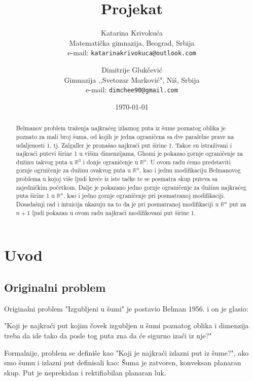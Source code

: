 \documentclass[11pt,letter]{article}
\begin{document}
\title{\bf{Projekat}}

\author{
Katarina Krivoku\'ca \\
Matemati\v cka gimnazija, Beograd, Srbija\\
e-mail: \tt{katarinakrivokuca@outlook.com} \\
\and
Dimitrije Gluk\v cevi\' c \\
Gimnazija ,,Svetozar Markovi\' c", Ni\v s, Srbija \\
e-mail: \tt{dimchee90@gmail.com} \\
}

\date{\today}
\maketitle %

\begin{abstract}
Belmanov problem tra\v zenja najkra\' ceg izlaznog puta iz \v sume poznatog oblika je poznato za mali broj \v suma, od kojih je jedna ograni\v cena sa dve paralelne prave na udaljenosti 1, tj. Zalgaller je prona\v sao najkra\' ci put \v sirine 1. Tako\dj e su istra\v zivani i najkra\' ci putevi \v sirine 1 u vi\v sim dimenzijama, Ghomi je pokazao gornje ograni\v cenje za du\v zinu takvog puta u $\mathbb{R}^3$ i donje ograni\v cenje u $\mathbb{R}^n$. U ovom radu \' cemo predstaviti gornje ogrni\v cenje za du\v zinu ovakvog puta u $\mathbb{R}^n$, kao i jednu modifikaciju Belmanovog problema u kojoj vi\v se ljudi kre\' ce iz iste ta\v cke te se posmatra skup puteva sa zajedni\v ckim po\v cetkom. Dalje je pokazano jedno gornje ograni\v cenje za du\v zinu najkra\' ceg puta \v sirine 1 u $\mathbb{R}^n$, kao i jedno gornje ograni\v cenje pri posmatranoj modifikaciji. Dosada\v snji rad i intuicija ukazuju na to da je pri posmatranoj modifikaciji u $\mathbb{R}^n$ put za $n+1$ ljudi pokazan u ovom radu najkra\' ci modifikovani put \v sirine 1.


\end{abstract}

\section[Uvod]{Uvod}
\bigskip
\subsection[Originalni problem]{Originalni problem}
\bigskip
Originalni problem "Izgubljeni u \v sumi" je postavio Belman 1956. i on je glasio:
\begin{center}
"Koji je najkra\' ci put kojim \v covek izgubljen u \v sumi poznatog oblika i dimenzija treba da ide tako da posle tog puta zna da \' ce sigurno iza\' ci iz nje?"
\end{center}
\indent Formalnije, problem se defini\v se kao "Koji je najkra\' ci izlazni put iz \v sume?", ako smo \v sumu i izlazni put definisali kao:
\df \v Suma je zatvoren, konveksan planaran skup.
\df Put je neprekidan i rektifiabilan planaran luk.
\\
\end{document}
